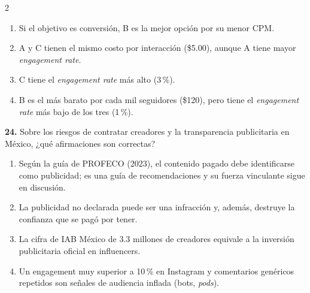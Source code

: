 \documentclass[10pt,letterpaper]{article}
\newcommand{\cas}{\framebox[1.0em]{\rule{0pt}{1.05ex}}}
\begin{document}
\begin{multicols}{2}
\begin{minipage}[t]{\columnwidth}
\vspace{1pt}\begin{enumerate}[label=\cas\ \alph*),leftmargin=2.3em,itemsep=1.2pt,topsep=1pt,parsep=0pt,partopsep=0pt]
\item Si el objetivo es conversión, B es la mejor opción por su menor CPM.
\item A y C tienen el mismo costo por interacción (\$5.00), aunque A tiene mayor \textit{engagement rate}.
\item C tiene el \textit{engagement rate} más alto (3\,\%).
\item B es el más barato por cada mil seguidores (\$120), pero tiene el \textit{engagement rate} más bajo de los tres (1\,\%).
\end{enumerate}\end{minipage}\par\vspace{3pt}
\begin{minipage}[t]{\columnwidth}\noindent\textbf{24.} Sobre los riesgos de contratar creadores y la transparencia publicitaria en México, ¿qué afirmaciones son correctas?
\vspace{1pt}\begin{enumerate}[label=\cas\ \alph*),leftmargin=2.3em,itemsep=1.2pt,topsep=1pt,parsep=0pt,partopsep=0pt]
\item Según la guía de PROFECO (2023), el contenido pagado debe identificarse como publicidad; es una guía de recomendaciones y su fuerza vinculante sigue en discusión.
\item La publicidad no declarada puede ser una infracción y, además, destruye la confianza que se pagó por tener.
\item La cifra de IAB México de 3.3 millones de creadores equivale a la inversión publicitaria oficial en influencers.
\item Un engagement muy superior a 10\,\% en Instagram y comentarios genéricos repetidos son señales de audiencia inflada (bots, \textit{pods}).
\end{enumerate}\end{minipage}\par\vspace{3pt}
\end{multicols}
\end{document}
